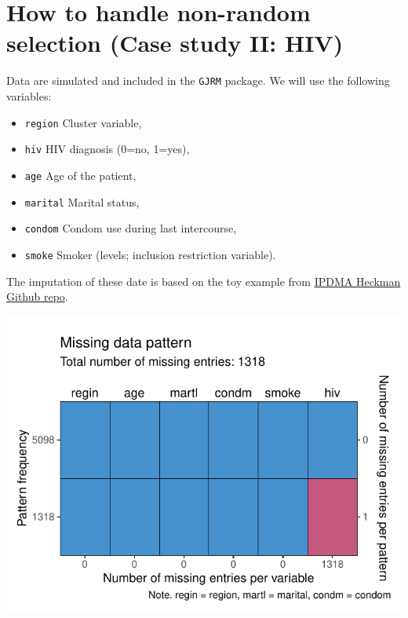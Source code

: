\documentclass[
]{jss}
\providecommand{\tightlist}{%
  \setlength{\itemsep}{0pt}\setlength{\parskip}{0pt}}
\begin{document}
\hypertarget{how-to-handle-non-random-selection-case-study-ii-hiv}{%
\section{How to handle non-random selection (Case study II:
HIV)}\label{how-to-handle-non-random-selection-case-study-ii-hiv}}

Data are simulated and included in the \texttt{GJRM} package. We will
use the following variables:

\begin{itemize}
\tightlist
\item
  \texttt{region} Cluster variable,
\item
  \texttt{hiv} HIV diagnosis (0=no, 1=yes),
\item
  \texttt{age} Age of the patient,
\item
  \texttt{marital} Marital status,
\item
  \texttt{condom} Condom use during last intercourse,
\item
  \texttt{smoke} Smoker (levels; inclusion restriction variable).
\end{itemize}

The imputation of these date is based on the toy example from
\href{https://github.com/johamunoz/Heckman-IPDMA/blob/main/Toy_example.R}{IPDMA
Heckman Github repo}.

\begin{CodeChunk}


\begin{center}\includegraphics{Manuscript_files/figure-latex/hiv-1} \end{center}

\end{CodeChunk}
\end{document}
